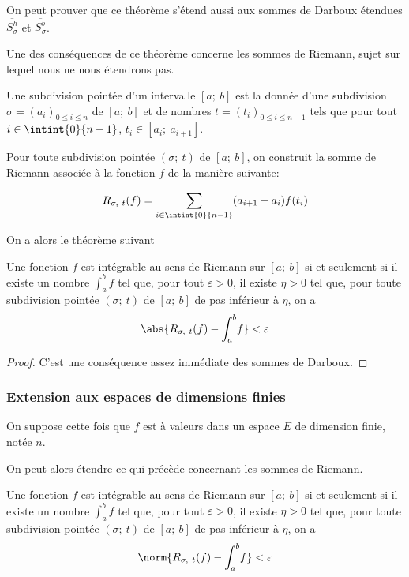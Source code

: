 On peut prouver que ce théorème s'étend aussi aux sommes de Darboux \og étendues \fg{} $\overline{S_\sigma^h}$ et $\overline{S_\sigma^b}$.

Une des conséquences de ce théorème concerne les sommes de Riemann, sujet sur lequel nous ne nous étendrons pas.

\begin{de}
Une subdivision pointée d'un intervalle $[a;~b]$ est la donnée d'une subdivision $\sigma = (a_i)_{0 \leq i \leq n}$ de $[a;~b]$ et de nombres $t = (t_i)_{0 \leq i \leq n-1}$ tels que pour tout $i \in \intint{0}{n-1}$, $t_i \in [a_i;~a_{i+1}]$.

Pour toute subdivision pointée $(\sigma;~t)$ de $[a;~b]$, on construit la somme de Riemann associée à la fonction $f$ de la manière suivante:

\[
R_{\sigma,~t}(f) = \displaystyle{\sum \limits_{i \in \intint{0}{n-1}}} (a_{i+1}-a_i)f(t_i)
\]
\end{de}

On a alors le théorème suivant

\begin{theo}
Une fonction $f$ est intégrable au sens de Riemann sur $[a;~b]$ si et seulement si il existe un nombre $\displaystyle{\int_a^b} f$ tel que, pour tout $\varepsilon>0$, il existe $\eta>0$ tel que, pour toute subdivision pointée $(\sigma;~t)$ de $[a;~b]$ de pas inférieur à $\eta$, on a
\[
\abs{R_{\sigma,~t}(f) - \displaystyle{\int_a^b} f} < \varepsilon
\]
\end{theo}

\begin{proof}
C'est une conséquence assez immédiate des sommes de Darboux.
\end{proof}

\subsubsection{Extension aux espaces de dimensions finies}

On suppose cette fois que $f$ est à valeurs dans un espace $E$ de dimension finie, notée $n$.

On peut alors étendre ce qui précède concernant les sommes de Riemann.

\begin{cor}
Une fonction $f$ est intégrable au sens de Riemann sur $[a;~b]$ si et seulement si il existe un nombre $\displaystyle{\int_a^b} f$ tel que, pour tout $\varepsilon>0$, il existe $\eta>0$ tel que, pour toute subdivision pointée $(\sigma;~t)$ de $[a;~b]$ de pas inférieur à $\eta$, on a
\[
\norm{R_{\sigma,~t}(f) - \displaystyle{\int_a^b} f} < \varepsilon
\]
\end{cor}

